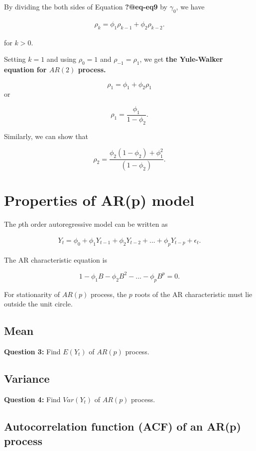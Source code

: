 \documentclass[
  11pt,
  a4paper,
]{report}
\begin{document}
By dividing the both sides of Equation \textbf{?@eq-eq9} by
\(\gamma_0\), we have

\begin{align}
 \rho_k=\phi_1\rho_{k-1}+\phi_2\rho_{k-2}.
\end{align}

for \(k>0\).

Setting \(k=1\) and using \(\rho_0=1\) and \(\rho_{-1}=\rho_1\), we get
\textbf{the Yule-Walker equation for \(AR(2)\) process.}

\[\rho_1=\phi_1+\phi_2 \rho_1\] or

\[\rho_1 = \frac{\phi_1}{1-\phi_2}.\]

Similarly, we can show that

\[\rho_2 = \frac{\phi_2(1-\phi_2)+\phi_1^2}{(1-\phi_2)}.\]

\section{Properties of AR(p) model}\label{properties-of-arp-model}

The \(p\)th order autoregressive model can be written as

\begin{align}
Y_t = \phi_0 + \phi_1Y_{t-1}+\phi_2 Y_{t-2}+ ... + \phi_p Y_{t-p}+\epsilon_t.
\end{align}

The AR characteristic equation is

\[1-\phi_1B-\phi_2B^2-...-\phi_pB^p=0.\]

For stationarity of \(AR(p)\) process, the \(p\) roots of the AR
characteristic must lie outside the unit circle.

\subsection{Mean}\label{mean-2}

\textbf{Question 3: } Find \(E(Y_t)\) of \(AR(p)\) process.

\subsection{Variance}\label{variance-1}

\textbf{Question 4: } Find \(Var(Y_t)\) of \(AR(p)\) process.

\subsection{Autocorrelation function (ACF) of an AR(p)
process}\label{autocorrelation-function-acf-of-an-arp-process}
\end{document}

